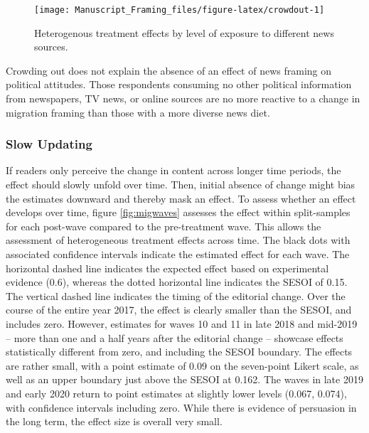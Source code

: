 \documentclass[
  12pt,
]{article}
\begin{document}
\begin{figure}[!ht]

{\centering \texttt{[image: Manuscript\_Framing\_files/figure-latex/crowdout-1]} 

}

\caption{Heterogenous treatment effects by level of exposure to different news sources.}\label{fig:crowdout}
\end{figure}

Crowding out does not explain the absence of an effect of news framing on political attitudes. Those respondents consuming no other political information from newspapers, TV news, or online sources are no more reactive to a change in migration framing than those with a more diverse news diet.

\hypertarget{slow-updating}{%
\subsubsection{Slow Updating}\label{slow-updating}}

If readers only perceive the change in content across longer time periods, the effect should slowly unfold over time. Then, initial absence of change might bias the estimates downward and thereby mask an effect. To assess whether an effect develops over time, figure \ref{fig:migwaves} assesses the effect within split-samples for each post-wave compared to the pre-treatment wave. This allows the assessment of heterogeneous treatment effects across time. The black dots with associated confidence intervals indicate the estimated effect for each wave. The horizontal dashed line indicates the expected effect based on experimental evidence (0.6), whereas the dotted horizontal line indicates the SESOI of 0.15. The vertical dashed line indicates the timing of the editorial change. Over the course of the entire year 2017, the effect is clearly smaller than the SESOI, and includes zero. However, estimates for waves 10 and 11 in late 2018 and mid-2019 -- more than one and a half years after the editorial change -- showcase effects statistically different from zero, and including the SESOI boundary. The effects are rather small, with a point estimate of 0.09 on the seven-point Likert scale, as well as an upper boundary just above the SESOI at 0.162. The waves in late 2019 and early 2020 return to point estimates at slightly lower levels (0.067, 0.074), with confidence intervals including zero. While there is evidence of persuasion in the long term, the effect size is overall very small.
\end{document}
